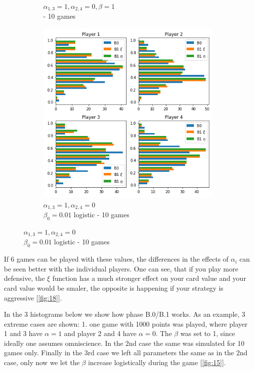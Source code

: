 \begin{figure}[ht]
\begin{subfigure}{0.32\textwidth}
	    \caption{$\alpha_{1,3}=1,\alpha_{2,4}=0,\beta=1$ \\ - 10 games}
	    \label{fig:31}
    \end{subfigure}%
	\begin{subfigure}{0.32\textwidth}
	    \centering
	    \includegraphics[width=1\linewidth]{Bilder/exp3_2.png}
	    \caption{$\alpha_{1,3}=1,\alpha_{2,4}=0$ \\ $\beta_0=0.01$ logistic - 10 games}
	    \label{fig:32}
	\end{subfigure}
\end{figure}

If 6 games can be played with these values, the differences in the effects of $\alpha_i$ can be seen better with the individual players. One can see, that if you play more defensive, the $\xi$ function has a much stronger effect on your card value and your card value would be smaler, the opposite is happening if your strategy is aggressive [\ref{fig:18}].

In the 3 histograms below we show how phase B.0/B.1 works. As an example, 3 extreme cases are shown: 1. one game with 1000 points was played, where player 1 and 3 have $\alpha = 1$ and player 2 and 4 have $\alpha=0$. The $\beta$ was set to 1, since ideally one assumes omniscience. In the 2nd case the same was simulated for 10 games only. Finally in the 3rd case we left all parameters the same as in the 2nd case, only now we let the $\beta$ increase logistically during the game [\ref{fig:15}].

